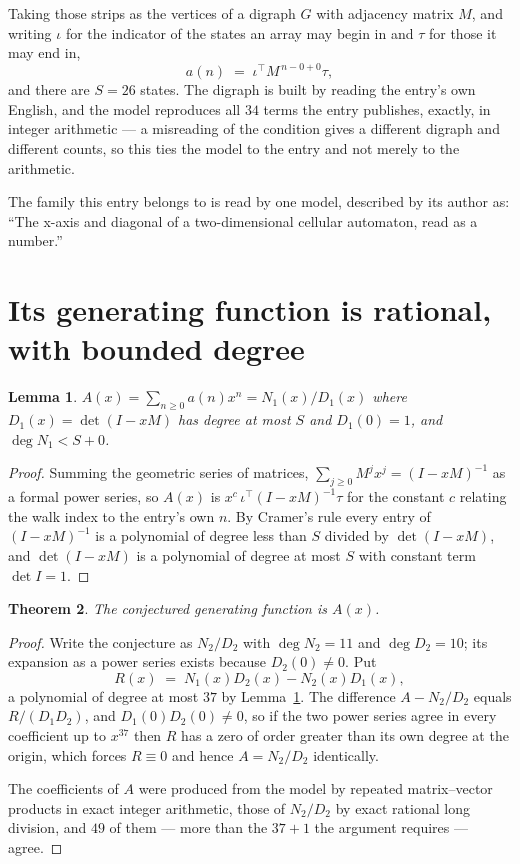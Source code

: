 \documentclass[11pt,a4paper]{article}
\theoremstyle{plain}
\newtheorem{theorem}{Theorem}
\newtheorem{lemma}[theorem]{Lemma}
\theoremstyle{definition}
\begin{document}
Taking those strips as the vertices of a digraph $G$ with adjacency matrix $M$, and writing
$\iota$ for the indicator of the states an array may begin in and $\tau$ for those it may end
in,
\[
a(n)\;=\;\iota^{\!\top}M^{\,n-0+0}\tau ,
\]
and there are $S=26$ states. The digraph is built by reading the entry's own English, and the
model reproduces all $34$ terms the entry publishes, exactly, in integer arithmetic --- a
misreading of the condition gives a different digraph and different counts, so this ties the
model to the entry and not merely to the arithmetic.

The family this entry belongs to is read by one model, described by its author as: ``The x-axis and diagonal of a two-dimensional cellular automaton, read as a number.''


\section{Its generating function is rational, with bounded degree}

\begin{lemma}\label{lem:rat}
$A(x)=\sum_{n\ge0}a(n)x^n=N_1(x)/D_1(x)$ where $D_1(x)=\det(I-xM)$ has degree at most
$S$ and $D_1(0)=1$, and $\deg N_1<S+0$.
\end{lemma}

\begin{proof}
Summing the geometric series of matrices, $\sum_{j\ge0}M^jx^j=(I-xM)^{-1}$ as a formal
power series, so $A(x)$ is $x^{c}\,\iota^{\!\top}(I-xM)^{-1}\tau$ for the constant $c$
relating the walk index to the entry's own $n$. By Cramer's rule every entry of
$(I-xM)^{-1}$ is a polynomial of degree less than $S$ divided by $\det(I-xM)$, and
$\det(I-xM)$ is a polynomial of degree at most $S$ with constant term $\det I=1$.
\end{proof}

\begin{theorem}
The conjectured generating function is $A(x)$.
\end{theorem}

\begin{proof}
Write the conjecture as $N_2/D_2$ with $\deg N_2=11$ and $\deg D_2=10$; its expansion as a
power series exists because $D_2(0)\neq0$. Put
\[
R(x)\;=\;N_1(x)D_2(x)-N_2(x)D_1(x),
\]
a polynomial of degree at most $37$ by Lemma~\ref{lem:rat}. The difference
$A-N_2/D_2$ equals $R/(D_1D_2)$, and $D_1(0)D_2(0)\neq0$, so if the two power series agree in
every coefficient up to $x^{37}$ then $R$ has a zero of order greater than its own
degree at the origin, which forces $R\equiv0$ and hence $A=N_2/D_2$ identically.

The coefficients of $A$ were produced from the model by repeated matrix--vector products in
exact integer arithmetic, those of $N_2/D_2$ by exact rational long division, and $49$
of them --- more than the $37+1$ the argument requires --- agree.
\end{proof}
\end{document}
